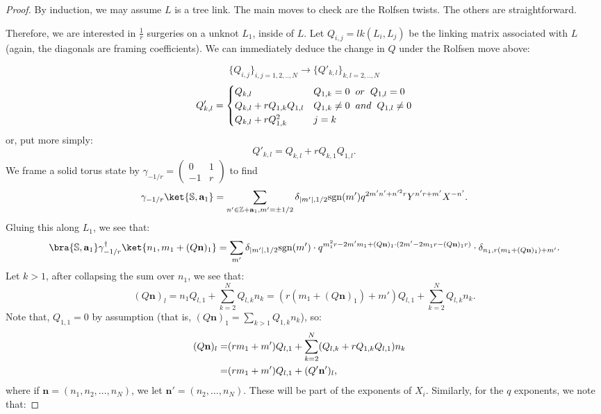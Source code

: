 \documentclass{article}
\newcommand{\Z}{{\mathbb Z}}
\numberwithin{corollary}{theorem}
\numberwithin{corollary}{proposition}
\begin{document}
\begin{proof}
    By induction, we may assume $L$ is a tree link. The main moves to check are the Rolfsen twists. The others are straightforward. 

Therefore, we are interested in $\frac{1}{r}$ surgeries on a unknot $L_1$, inside of $L$. Let $Q_{i,j} = lk(L_i,L_j)$ be the linking matrix associated with $L$ (again, the diagonals are framing coefficients). We can immediately deduce the change in $Q$ under the Rolfsen move above:

$$\{Q_{i,j}\}_{i,j=1,2,..,N} \longrightarrow \{Q'_{k,l}\}_{k,l=2,..,N} $$
$$Q'_{k,l} =  \begin{cases} 
      Q_{k,l} & Q_{1,k} = 0 \hspace{2mm} or\hspace{2mm}Q_{1,l} =0 \\
      Q_{k,l} + r Q_{1,k}Q_{1,l} & Q_{1,k} \neq 0 \hspace{2mm} and \hspace{2mm}Q_{1,l} \neq0\\
      Q_{k,l} + r Q_{1,k}^2 & j=k  
   \end{cases}
$$
or, put more simply:
$$Q'_{k,l} = Q_{k,l} + r Q_{k,1}Q_{1,l}.$$
We frame a solid torus state by $\gamma_{-1/r} = \begin{pmatrix}
    0&1\\
    -1&r
\end{pmatrix}$ to find
$$\gamma_{-1/r} \ket{\mathbb{S},\mathbf{a}_1} = \sum_{n'\in \Z+\mathbf{a}_1,m'=\pm1/2} \delta_{|m'|,1/2} \mathrm{sgn}(m') q^{2m'n' +n'^2r} Y^{n'r+m'} X^{-n'}. $$
Gluing this along $L_1$, we see that:
$$\bra{\mathbb{S},\mathbf{a}_1}\gamma_{-1/r}^\dagger\ket{{n_1},{m_1+(Q \mathbf{n})_1}} = \sum_{m'} \delta_{|m'|,1/2} \mathrm{sgn}(m')\cdot  q^{m_1^2 r - 2m'm_1+(Q\mathbf{n})_1 \cdot (2m' - 2m_1 r -(Q\mathbf{n})_1 r )} \cdot \delta_{n_1, r(m_1+(Q \mathbf{n})_1)+m'}.$$
Let $k>1$, after collapsing the sum over $n_1$, we see that:
$$(Q \mathbf{n})_l = n_1 Q_{l,1} + \sum_{k=2}^N Q_{l,k}n_k = (r(m_1+(Q \mathbf{n})_1)+m') Q_{l,1} + \sum_{k=2}^N Q_{l,k}n_k. $$
Note that, $Q_{1,1} =0$ by assumption (that is, $(Q\mathbf{n})_1 = \sum_{k>1} Q_{1,k}n_k$), so: 
\begin{align*}
   (Q \mathbf{n})_l  =& (rm_1 +m')Q_{l,1} +\sum^N_{k=2} (Q_{l,k}+r Q_{1,k} Q_{l,1})n_k  \endline
   =& (rm_1 +m')Q_{l,1} + (Q' \mathbf{n'})_l ,
\end{align*}
where if $\mathbf{n}=(n_1,n_2,\ldots,n_N)$, we let $\mathbf{n'} = (n_2,\ldots,n_N)$. These will be part of the exponents of $X_i$. Similarly, for the $q$ exponents, we note that: 

\end{proof}
\end{document}
